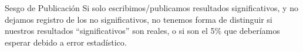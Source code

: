 \documentclass{beamer}
\begin{document}
{ %
    \begin{frame}[plain]
     \end{frame}
}




\begin {frame}{Sesgo de Publicación}
Si solo escribimos/publicamos resultados significativos, y no dejamos registro de los no significativos, no tenemos forma de distinguir si nuestros resultados ``significativos'' son reales, o si son el 5\% que deberíamos esperar debido a error estadístico. 

\end{frame}
\end{document}
